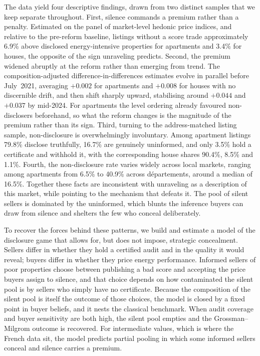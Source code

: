 The data yield four descriptive findings, drawn from two distinct samples that we keep separate
throughout. First, silence commands a premium rather than a penalty. Estimated on the panel of
market-level hedonic price indices, and relative to the pre-reform baseline, listings without a
score trade approximately 6.9\% above disclosed energy-intensive properties for apartments and
3.4\% for houses, the opposite of the sign unraveling predicts. Second, the premium widened
abruptly at the reform rather than emerging from trend. The composition-adjusted
difference-in-differences estimates evolve in parallel before July~2021, averaging $+0.002$ for
apartments and $+0.008$ for houses with no discernible drift, and then shift sharply upward,
stabilising around $+0.044$ and $+0.037$ by mid-2024. For apartments the level ordering already
favoured non-disclosers beforehand, so what the reform changes is the magnitude of the premium
rather than its sign. Third, turning to the address-matched listing sample, non-disclosure is
overwhelmingly involuntary. Among apartment listings 79.8\% disclose truthfully, 16.7\% are
genuinely uninformed, and only 3.5\% hold a certificate and withhold it, with the corresponding
house shares 90.4\%, 8.5\% and 1.1\%.
Fourth, the non-disclosure rate varies widely across local markets, ranging among
apartments from 6.5\% to 40.9\% across d\'epartements, around a median of 16.5\%. Together
these facts are inconsistent with unraveling as a description of this market, while pointing to
the mechanism that defeats it. The pool of silent sellers is dominated by the uninformed, which
blunts the inference buyers can draw from silence and shelters the few who conceal
deliberately.

To recover the forces behind these patterns, we build and estimate a model of the disclosure
game that allows for, but does not impose, strategic concealment. Sellers differ in whether they
hold a certified audit and in the quality it would reveal; buyers differ in whether they price
energy performance. Informed sellers of poor properties choose between publishing a bad score
and accepting the price buyers assign to silence, and that choice depends on how contaminated
the silent pool is by sellers who simply have no certificate. Because the composition of the
silent pool is itself the outcome of those choices, the model is closed by a fixed point in
buyer beliefs, and it nests the classical benchmark. When audit coverage and buyer sensitivity
are both high, the silent pool empties and the Grossman--Milgrom outcome is recovered. For
intermediate values, which is where the French data sit, the model predicts partial pooling in
which some informed sellers conceal and silence carries a premium.

